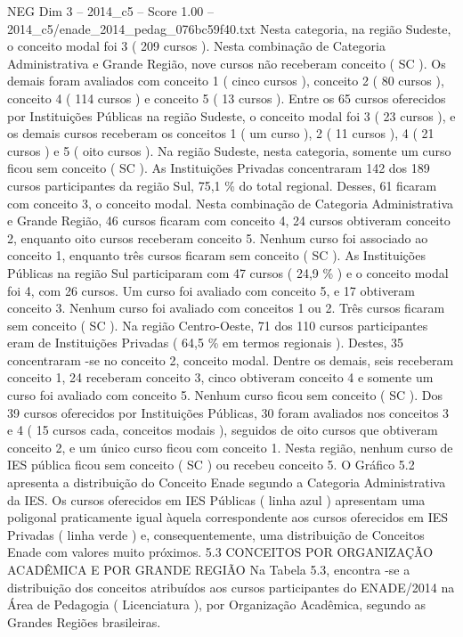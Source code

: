 \begin{textsample}{NEG Dim 3 – 2014\_c5 – Score 1.00 – 2014\_c5/enade\_2014\_pedag\_076bc59f40.txt}
Nesta categoria, na região Sudeste, o conceito modal foi 3 ( 209 cursos ).
Nesta combinação de Categoria Administrativa e Grande Região, nove cursos não receberam conceito ( SC ).
Os demais foram avaliados com conceito 1 ( cinco cursos ), conceito 2 ( 80 cursos ), conceito 4 ( 114 cursos ) e conceito 5 ( 13 cursos ).
Entre os 65 cursos oferecidos por Instituições Públicas na região Sudeste, o conceito modal foi 3 ( 23 cursos ), e os demais cursos receberam os conceitos 1 ( um curso ), 2 ( 11 cursos ), 4 ( 21 cursos ) e 5 ( oito cursos ).
Na região Sudeste, nesta categoria, somente um curso ficou sem conceito ( SC ).
As Instituições Privadas concentraram 142 dos 189 cursos participantes da região Sul, 75,1 \% do total regional.
Desses, 61 ficaram com conceito 3, o conceito modal.
Nesta combinação de Categoria Administrativa e Grande Região, 46 cursos ficaram com conceito 4, 24 cursos obtiveram conceito 2, enquanto oito cursos receberam conceito 5.
Nenhum curso foi associado ao conceito 1, enquanto três cursos ficaram sem conceito ( SC ).
As Instituições Públicas na região Sul participaram com 47 cursos ( 24,9 \% ) e o conceito modal foi 4, com 26 cursos.
Um curso foi avaliado com conceito 5, e 17 obtiveram conceito 3.
Nenhum curso foi avaliado com conceitos 1 ou 2.
Três cursos ficaram sem conceito ( SC ).
Na região Centro-Oeste, 71 dos 110 cursos participantes eram de Instituições Privadas ( 64,5 \% em termos regionais ).
Destes, 35 concentraram -se no conceito 2, conceito modal.
Dentre os demais, seis receberam conceito 1, 24 receberam conceito 3, cinco obtiveram conceito 4 e somente um curso foi avaliado com conceito 5.
Nenhum curso ficou sem conceito ( SC ).
Dos 39 cursos oferecidos por Instituições Públicas, 30 foram avaliados nos conceitos 3 e 4 ( 15 cursos cada, conceitos modais ), seguidos de oito cursos que obtiveram conceito 2, e um único curso ficou com conceito 1.
Nesta região, nenhum curso de IES pública ficou sem conceito ( SC ) ou recebeu conceito 5.
O Gráfico 5.2 apresenta a distribuição do Conceito Enade segundo a Categoria Administrativa da IES.
Os cursos oferecidos em IES Públicas ( linha azul ) apresentam uma poligonal praticamente igual àquela correspondente aos cursos oferecidos em IES Privadas ( linha verde ) e, consequentemente, uma distribuição de Conceitos Enade com valores muito próximos. 5.3 CONCEITOS POR ORGANIZAÇÃO ACADÊMICA E POR GRANDE REGIÃO Na Tabela 5.3, encontra -se a distribuição dos conceitos atribuídos aos cursos participantes do ENADE/2014 na Área de Pedagogia ( Licenciatura ), por Organização Acadêmica, segundo as Grandes Regiões brasileiras.

\end{textsample}
